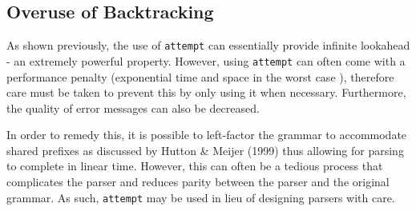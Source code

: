 \subsection{Overuse of Backtracking}
\label{ssec:over_backtrack}

As shown previously, the use of \texttt{attempt} can essentially provide infinite lookahead - an extremely powerful property.
However, using \texttt{attempt} can often come with a performance penalty (exponential time and space in the worst case \cite{leijen01}), therefore care must be taken to prevent this by only using it when necessary.
Furthermore, the quality of error messages can also be decreased.

In order to remedy this, it is possible to left-factor the grammar to accommodate shared prefixes as discussed by Hutton \& Meijer (1999) \cite{hutton99} thus allowing for parsing to complete in linear time.
However, this can often be a tedious process that complicates the parser and reduces parity between the parser and the original grammar.
As such, \texttt{attempt} may be used in lieu of designing parsers with care.
